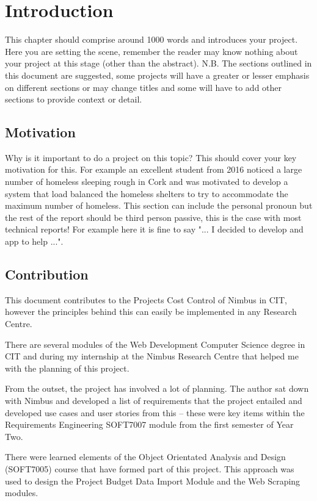 \chapter{Introduction}
\label{chap:intro}
This chapter should comprise around 1000 words and introduces your project. Here you are setting the scene, remember the reader may know nothing about your project at this stage (other than the abstract). N.B. The sections outlined in this document are suggested, some projects will have a greater or lesser emphasis on different sections or may change titles and some will have to add other sections to provide context or detail.

\section{Motivation}
Why is it important to do a project on this topic? This should cover your key motivation for this. For example an excellent student from 2016 noticed a large number of homeless sleeping rough in Cork and was motivated to develop a system that load balanced the homeless shelters to try to accommodate the maximum number of homeless. This section can include the personal pronoun but the rest of the report should be third person passive, this is the case with most technical reports! For example here it is fine to say "... I decided to develop and app to help ...".

\section{Contribution}
This document contributes to the Projects Cost Control of Nimbus in CIT, however the principles behind this can easily be implemented in any Research Centre.
 
There are several modules of the Web Development Computer Science degree in CIT and during my internship at the Nimbus Research Centre that helped me with the planning of this project.

From the outset, the project has involved a lot of planning. The author sat down with Nimbus and developed a list of requirements that the project entailed and developed use cases and user stories from this – these were key items within the Requirements Engineering SOFT7007 module from the first semester of Year Two.

There were learned elements of the Object Orientated Analysis and Design (SOFT7005) course that have formed part of this project. This approach was used to design the Project Budget Data Import Module and the Web Scraping modules.

